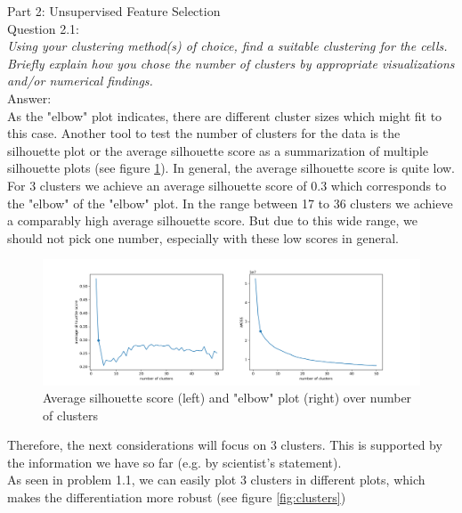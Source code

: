 Part 2: Unsupervised Feature Selection\\
Question 2.1:\\	
\textsl{Using your clustering method(s) of choice, find a suitable clustering for the cells. Briefly explain how you chose the number of clusters by appropriate visualizations and/or numerical findings.}\\

Answer:\\
As the "elbow" plot indicates, there are different cluster sizes which might fit to this case. Another tool to test the number of clusters for the data is the silhouette plot or the average silhouette score as a summarization of multiple silhouette plots (see figure \ref{fig:silhouette_elbow}). In general, the average silhouette score is quite low. For 3 clusters we achieve an average silhouette score of 0.3 which corresponds to the "elbow" of the "elbow" plot. In the range between 17 to 36 clusters we achieve a comparably high average silhouette score. But due to this wide range, we should not pick one number, especially with these low scores in general.\\

\begin{figure}[h]
	\centering
	\includegraphics[width=1\linewidth]{problem_02/silhouette_elbow}
	\caption{Average silhouette score (left) and "elbow" plot (right) over number of clusters}
	\label{fig:silhouette_elbow}
\end{figure}

Therefore, the next considerations will focus on 3 clusters. This is supported by the information we have so far (e.g. by scientist's statement).\\

As seen in problem 1.1, we can easily plot 3 clusters in different plots, which makes the differentiation more robust (see figure \ref{fig:clusters})\\